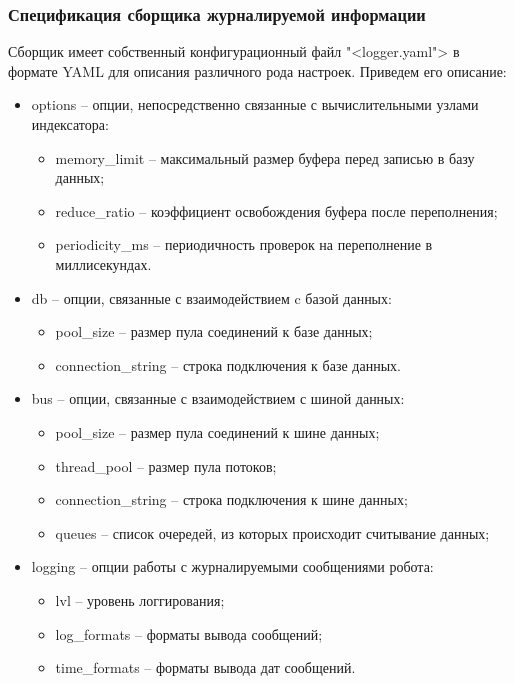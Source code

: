 \subsubsection{Спецификация сборщика журналируемой информации}

Сборщик имеет собственный конфигурационный файл "<logger.yaml"> в формате YAML для описания различного рода настроек. Приведем его описание:
\begin{itemize}
\item options -- опции, непосредственно связанные с вычислительными узлами индексатора:
\begin{itemize}
\item memory\_limit -- максимальный размер буфера перед записью в базу данных;
\item reduce\_ratio -- коэффициент освобождения буфера после переполнения;
\item periodicity\_ms -- периодичность проверок на переполнение в миллисекундах.
\end{itemize}
\item db -- опции, связанные с взаимодействием c базой данных:
\begin{itemize}
\item pool\_size -- размер пула соединений к базе данных;
\item connection\_string -- строка подключения к базе данных.
\end{itemize}
\item bus -- опции, связанные с взаимодействием с шиной данных:
\begin{itemize}
\item pool\_size -- размер пула соединений к шине данных;
\item thread\_pool -- размер пула потоков;
\item connection\_string -- строка подключения к шине данных;
\item queues -- список очередей, из которых происходит считывание данных;
\end{itemize}
\item logging -- опции работы с журналируемыми сообщениями робота:
\begin{itemize}
\item lvl -- уровень логгирования;
\item log\_formats -- форматы вывода сообщений;
\item time\_formats -- форматы вывода дат сообщений.
\end{itemize}
\end{itemize}

